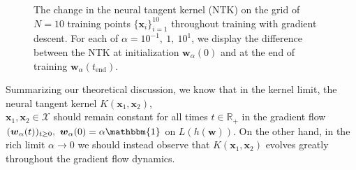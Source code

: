 \documentclass{article}
\begin{document}
\begin{figure}[H]
\centering
{}\hfill
{}\par 
{}
\caption{The change in the neural tangent kernel (NTK) on the grid of $N= 10$ training points $\{ \boldsymbol{x}_i \}_{i=1}^{10}$ throughout training with gradient descent. For each of $\alpha = 10^{-1}, \ 1, \ 10^{1}$, we display the difference between the NTK at initialization $\boldsymbol{w}_{\alpha}(0)$ and at the end of training $\boldsymbol{w}_{\alpha}(t_{\text{end}})$.}\label{img:ntkchange}
\end{figure}

Summarizing our theoretical discussion, we know that in the kernel limit, the neural tangent kernel $K(\boldsymbol{x}_1, \boldsymbol{x}_2)$,\\ $\boldsymbol{x}_1, \boldsymbol{x}_2 \in \mathcal{X}$ should remain constant for all times $t \in \mathbb{R}_+$ in the gradient flow $(\boldsymbol{w}_{\alpha}(t))_{t \geq 0}, \ \boldsymbol{w}_{\alpha}(0) = \alpha \mathbbm{1}$ on $L(h(\boldsymbol{w}))$. On the other hand, in the rich limit $\alpha \rightarrow 0$ we should instead observe that $K(\boldsymbol{x}_1, \boldsymbol{x}_2)$ evolves greatly throughout the gradient flow dynamics.
\end{document}
